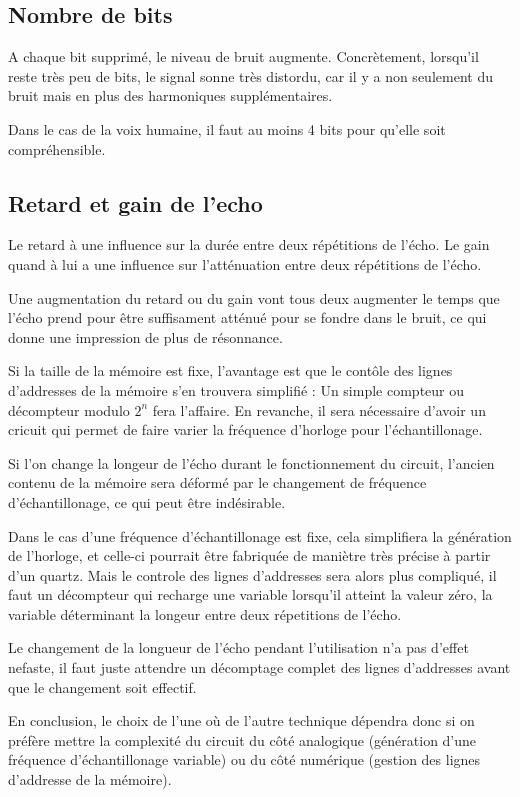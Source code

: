 \documentclass{article}
\begin{document}

\subsection{Nombre de bits}
A chaque bit supprimé, le niveau de bruit augmente.
Concrètement, lorsqu'il reste très peu de bits, le signal sonne très distordu, car il y a non seulement du bruit mais en plus des harmoniques supplémentaires.

Dans le cas de la voix humaine, il faut au moins 4 bits pour qu'elle soit compréhensible.

\subsection{Retard et gain de l'echo}
Le retard à une influence sur la durée entre deux répétitions de l'écho.
Le gain quand à lui a une influence sur l'atténuation entre deux répétitions de l'écho.

Une augmentation du retard ou du gain vont tous deux augmenter le temps que l'écho prend pour être suffisament atténué pour se fondre dans le bruit, ce qui donne une impression de plus de résonnance.

Si la taille de la mémoire est fixe, l'avantage est que le contôle des lignes d'addresses de la mémoire s'en trouvera simplifié : Un simple compteur ou décompteur modulo $2^n$ fera l'affaire.
En revanche, il sera nécessaire d'avoir un cricuit qui permet de faire varier la fréquence d'horloge pour l'échantillonage.

Si l'on change la longeur de l'écho durant le fonctionnement du circuit, l'ancien contenu de la mémoire sera déformé par le changement de fréquence d'échantillonage, ce qui peut être indésirable.

Dans le cas d'une fréquence d'échantillonage est fixe, cela simplifiera la génération de l'horloge, et celle-ci pourrait être fabriquée de maniètre très précise à partir d'un quartz.
Mais le controle des lignes d'addresses sera alors plus compliqué, il faut un décompteur qui recharge une variable lorsqu'il atteint la valeur zéro, la variable déterminant la longeur entre deux répetitions de l'écho.

Le changement de la longueur de l'écho pendant l'utilisation n'a pas d'effet nefaste, il faut juste attendre un décomptage complet des lignes d'addresses avant que le changement soit effectif.

En conclusion, le choix de l'une où de l'autre technique dépendra donc si on préfère mettre la complexité du circuit du côté analogique (génération d'une fréquence d'échantillonage variable) ou du côté numérique (gestion des lignes d'addresse de la mémoire).
\end{document}
